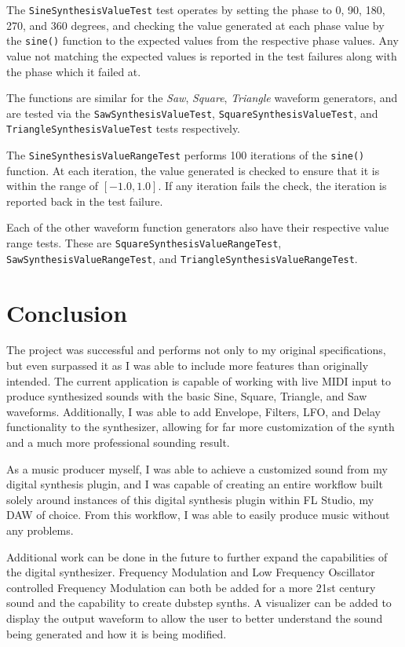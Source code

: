 \documentclass[a4paper,12pt]{report}
\begin{document}
The \texttt{Sine\-Synthesis\-Value\-Test} test operates by setting the phase to 0, 90, 180, 270, and 360 degrees, and checking the value generated at each phase value by the \texttt{sine()} function to the expected values from the respective phase values. Any value not matching the expected values is reported in the test failures along with the phase which it failed at.

The functions are similar for the \emph{Saw}, \emph{Square}, \emph{Triangle} waveform generators, and are tested via the \texttt{Saw\-Synthesis\-Value\-Test}, \texttt{Square\-Synthesis\-Value\-Test}, and \texttt{Triangle\-Synthesis\-Value\-Test} tests respectively.

The \texttt{Sine\-Synthesis\-Value\-Range\-Test} performs 100 iterations of the \texttt{sine()} function. At each iteration, the value generated is checked to ensure that it is within the range of $[-1.0,1.0]$. If any iteration fails the check, the iteration is reported back in the test failure.

Each of the other waveform function generators also have their respective value range tests. These are \texttt{Square\-Synthesis\-Value\-Range\-Test}, \texttt{Saw\-Synthesis\-Value\-Range\-Test}, and \texttt{Triangle\-Synthesis\-Value\-Range\-Test}.

\chapter*{Conclusion}
\label{chapter:results}
The project was successful and performs not only to my original specifications, but even surpassed it as I was able to include more features than originally intended. The current application is capable of working with live MIDI input to produce synthesized sounds with the basic Sine, Square, Triangle, and Saw waveforms. Additionally, I was able to add Envelope, Filters, LFO, and Delay functionality to the synthesizer, allowing for far more customization of the synth and a much more professional sounding result. 

As a music producer myself, I was able to achieve a customized sound from my digital synthesis plugin, and I was capable of creating an entire workflow built solely around instances of this digital synthesis plugin within FL Studio, my DAW of choice. From this workflow, I was able to easily produce music without any problems.

Additional work can be done in the future to further expand the capabilities of the digital synthesizer. Frequency Modulation and Low Frequency Oscillator controlled Frequency Modulation can both be added for a more 21st century sound and the capability to create dubstep synths. A visualizer can be added to display the output waveform to allow the user to better understand the sound being generated and how it is being modified.
\end{document}
